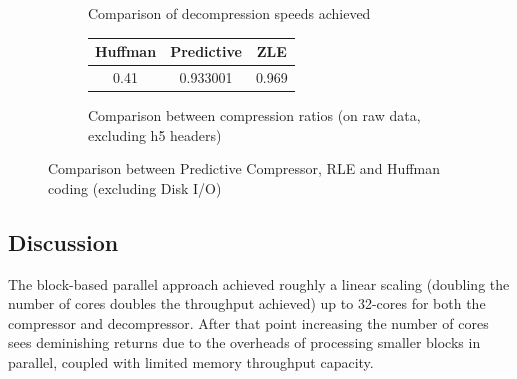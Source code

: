 \begin{figure}[ht!]
\begin{mdframed}
\begin{subfigure}[b]{0.6\textwidth}
  \caption{Comparison of decompression speeds achieved}
  \label{SPEED_CONCURRENT_COMPARISON_DECOMPRESSION}
  \end{subfigure}
  
  \begin{subfigure}[b]{0.7\textwidth}
    \centering
    \vspace{20pt}
    \begin{tabular}{|c|c|c|}
      \hline
      Huffman & Predictive & ZLE \\
      \hline
      0.41 & 0.933001 & 0.969\\
      \hline
    \end{tabular}
  \caption{Comparison between compression ratios (on raw data, excluding h5 headers)}
  \label{RATIO_CONCURRENT_COMPARISON}  
  \end{subfigure}
  
  \caption{Comparison between Predictive Compressor, RLE and Huffman coding (excluding Disk I/O)}
  \label{CONCURRENT_WORK}
  \end{mdframed}
\end{figure}
\subsection{Discussion}
The block-based parallel approach achieved roughly a linear scaling (doubling the number of cores doubles the throughput achieved) up to 32-cores for both the compressor and decompressor. 
After that point increasing the number of cores sees deminishing returns due to the overheads of processing smaller blocks in parallel, coupled with limited memory throughput capacity. 

